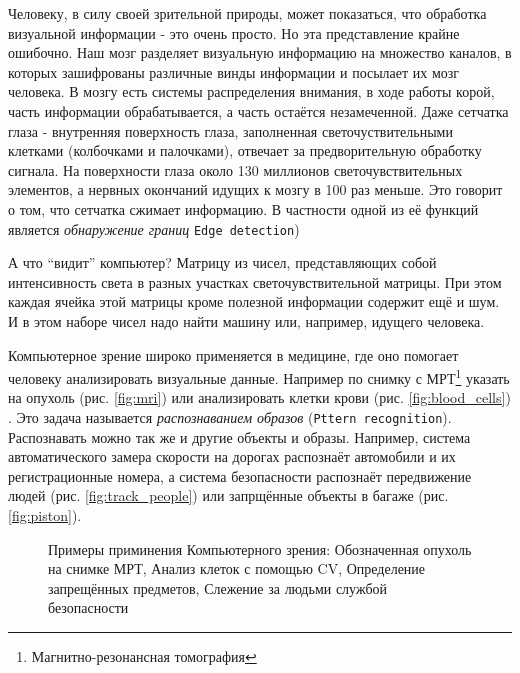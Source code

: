 \documentclass[12pt]{report}
\begin{document}
Человеку, в силу своей зрительной природы, может показаться, что обработка визуальной информации - это очень просто. Но эта представление крайне ошибочно. Наш мозг разделяет визуальную информацию на множество каналов, в которых зашифрованы различные винды информации и посылает их мозг человека. В мозгу есть системы распределения внимания, в ходе работы корой, часть информации обрабатывается, а часть остаётся незамеченной. \citep{bradski2008learning} Даже сетчатка глаза - внутренняя поверхность глаза, заполненная светочуствительными клетками (колбочками и палочками), отвечает за предворительную обработку сигнала. На поверхности глаза около 130 миллионов светочувствительных элементов, а нервных окончаний идущих к мозгу в 100 раз меньше. Это говорит о том, что сетчатка сжимает информацию. В частности одной из её функций является \emph{обнаружение границ} \texttt{Edge detection}) \citep{RetinaOnWiki}

А что ``видит'' компьютер? Матрицу из чисел, представляющих собой интенсивность света в разных участках светочувствительной матрицы. При этом каждая ячейка этой матрицы кроме полезной информации содержит ещё и шум. И в этом наборе чисел надо найти машину или, например, идущего человека.

Компьютерное зрение широко применяется в медицине, где оно помогает человеку анализировать визуальные данные. Например по снимку с МРТ\footnote{Магнитно-резонансная томография} указать на опухоль (рис.  \ref{fig:mri}) или анализировать клетки крови (рис. \ref{fig:blood_cells}) . Это задача называется \emph{распознаванием образов} (\texttt{Pttern recognition}). Распознавать можно так же и другие объекты и образы. Например, система автоматического замера скорости на дорогах распознаёт автомобили и их регистрационные номера, а система безопасности распознаёт передвижение людей (рис. \ref{fig:track_people}) или запрщённые объекты в багаже (рис. \ref{fig:piston}).

\begin{figure}[h]
	\centering
		
	\caption{Примеры приминения Компьютерного зрения:  Обозначенная опухоль на снимке МРТ,  Анализ клеток с помощью CV,  Определение запрещённых предметов,  Слежение за людьми службой безопасности}
	\label{fig:cv_usage}
\end{figure}
\end{document}
